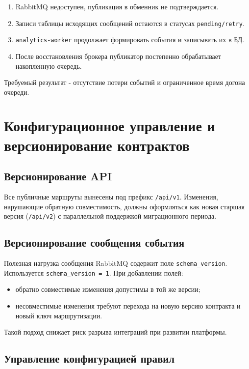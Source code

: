 \begin{enumerate}
    \item RabbitMQ недоступен, публикация в обменник не подтверждается.
    \item Записи таблицы исходящих сообщений остаются в статусах \texttt{pending/retry}.
    \item \texttt{analytics-worker} продолжает формировать события и записывать их в БД.
    \item После восстановления брокера публикатор постепенно обрабатывает накопленную очередь.
\end{enumerate}

Требуемый результат - отсутствие потери событий и ограниченное время догона очереди.

\section{Конфигурационное управление и версионирование контрактов}

\subsection{Версионирование API}

Все публичные маршруты вынесены под префикс \texttt{/api/v1}. Изменения, нарушающие обратную совместимость, должны оформляться как новая старшая версия (\texttt{/api/v2}) с параллельной поддержкой миграционного периода.

\subsection{Версионирование сообщения события}

Полезная нагрузка сообщения RabbitMQ содержит поле \texttt{schema\_version}. Используется \texttt{schema\_version = 1}. При добавлении полей:
\begin{itemize}
    \item обратно совместимые изменения допустимы в той же версии;
    \item несовместимые изменения требуют перехода на новую версию контракта и новый ключ маршрутизации.
\end{itemize}

Такой подход снижает риск разрыва интеграций при развитии платформы.

\subsection{Управление конфигурацией правил}

